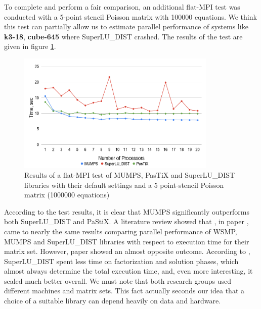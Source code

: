 

To complete and perform a fair comparison, an additional flat-MPI test was conducted with a 5-point stencil Poisson matrix with 100000 equations. We think this test can partially allow us to estimate parallel performance of systems like \textbf{k3-18}, \textbf{cube-645} where SuperLU\_DIST crashed. The results of the test are given in figure \ref{fig:5-point-stencil-solvers-comparison}.\\

\figpointer{\ref{fig:5-point-stencil-solvers-comparison}}
\begin{figure}[htpb]
  \centering
  \includegraphics[width=0.85\textwidth]{figures/chapter-2/solvers-comparison-5-point-stencil.png}
\caption{Results of a flat-MPI test of MUMPS, PasTiX and SuperLU\_DIST libraries with their default settings and a 5 point-stencil Poisson matrix (1000000  equations)}
\label{fig:5-point-stencil-solvers-comparison}
\end{figure}



According to the test results, it is clear that MUMPS significantly outperforms both SuperLU\_DIST and PaStiX. A literature review showed that \citeauthor{wsmp}, in paper \cite{wsmp}, came to nearly the same results comparing parallel performance of WSMP, MUMPS and SuperLU\_DIST libraries with respect to execution time for their matrix set. However, paper \cite{mm-comparison-of-packages} showed an almost opposite outcome. According to \citeauthor{mm-comparison-of-packages}, SuperLU\_DIST spent less time on factorization and solution phases, which almost always determine the total execution time, and, even more interesting, it scaled much better overall. We must note that both research groups used different machines and matrix sets. This fact actually seconds our idea that a choice of a suitable library can depend heavily on data and hardware.\\


